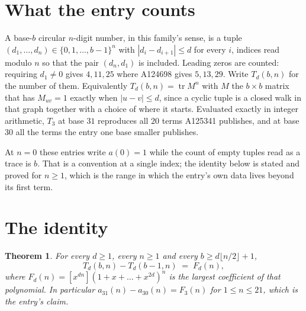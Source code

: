 \documentclass[11pt,a4paper]{article}
\theoremstyle{plain}
\newtheorem{theorem}{Theorem}
\theoremstyle{definition}
\begin{document}
\section{What the entry counts}

A base-$b$ circular $n$-digit number, in this family's sense, is a tuple
$(d_1,\dots,d_n)\in\{0,1,\dots,b-1\}^{n}$ with $|d_i-d_{i+1}|\le d$ for every $i$, indices
read modulo $n$ so that the pair $(d_n,d_1)$ is included. Leading zeros are counted: requiring
$d_1\ne0$ gives $4,11,25$ where A124698 gives $5,13,29$. Write $T_d(b,n)$ for the number of
them. Equivalently $T_d(b,n)=\operatorname{tr}M^{n}$ with $M$ the $b\times b$ matrix that has
$M_{uv}=1$ exactly when $|u-v|\le d$, since a cyclic tuple is a closed walk in that graph
together with a choice of where it starts. Evaluated exactly in integer arithmetic, $T_{3}$
at base $31$ reproduces all $20$ terms A125341 publishes, and at base $30$ all the
terms the entry one base smaller publishes.

At $n=0$ these entries write $a(0)=1$ while the count of empty tuples read as a trace is $b$.
That is a convention at a single index; the identity below is stated and proved for $n\ge1$,
which is the range in which the entry's own data lives beyond its first term.

\section{The identity}

\begin{theorem}
For every $d\ge1$, every $n\ge1$ and every $b\ge d\lfloor n/2\rfloor+1$,
\[
T_d(b,n)-T_d(b-1,n)\;=\;F_d(n),
\]
where $F_d(n)=[x^{dn}](1+x+\dots+x^{2d})^{n}$ is the largest coefficient of that
polynomial. In particular $a_{31}(n)-a_{30}(n)=F_{3}(n)$ for $1\le n\le21$, which
is the entry's claim.
\end{theorem}
\end{document}
